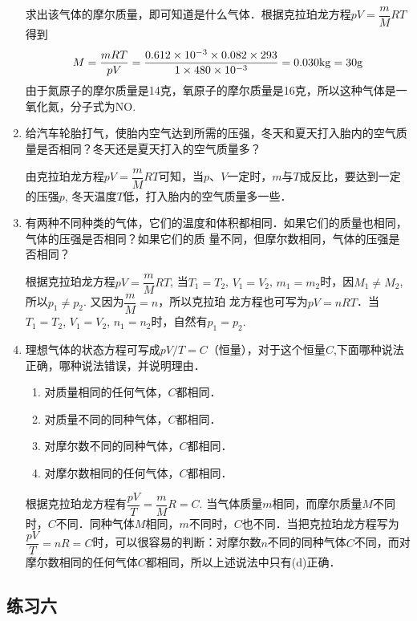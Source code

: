 \begin{enumerate}
\begin{solution}
         求出该气体的摩尔质量，即可知道是什么气体．根据克拉珀龙方程$pV=\dfrac{m}{M}RT$得到
\[M=\frac{mRT}{pV}=\frac{0.612\times 10^{-3}\times 0.082\times 293}{1\times 480\times 10^{-3}}=0.030{\rm kg}=30{\rm g}\]
由于氮原子的摩尔质量是14克，氧原子的摩尔质量是16克，所以这种气体是一氧化氮，分子式为NO.
\end{solution}
\item 给汽车轮胎打气，使胎内空气达到所需的压强，冬天和夏天打入胎内的空气质量是否相同？冬天还是夏天打入的空气质量多？

\begin{solution}
由克拉珀龙方程$pV=\dfrac{m}{M}RT$可知，当$p$、$V$一定时，$m$与$T$成反比，要达到一定的压强$p$, 冬天温度$T$低，打入胎内的空气质量多一些．
\end{solution}
\item 有两种不同种类的气体，它们的温度和体积都相同．如果它们的质量也相同，气体的压强是否相同？如果它们的质
量不同，但摩尔数相同，气体的压强是否相同？

\begin{solution}
根据克拉珀龙方程$pV=\dfrac{m}{M}RT$, 当$T_1=T_2$, $V_1=V_2$, $m_1=m_2$时，因$M_1\ne M_2$, 所以$p_1\ne p_2$. 又因为$\dfrac{m}{M}=n$，所以克拉珀
龙方程也可写为$pV=nRT$．当$T_1=T_2$, $V_1=V_2$, $n_1=n_2$时，自然有$p_1=p_2$.
\end{solution}
\item 理想气体的状态方程可写成$pV/T=C$（恒量），对于这个恒量$C$,下面哪种说法正确，哪种说法错误，并说明理由．
\begin{enumerate}
\item 对质量相同的任何气体，$C$都相同．\item 对质量不同的同种气体，$C$都相同．	\item 对摩尔数不同的同种气体，$C$都相同．\item 对摩尔数相同的任何气体，$C$都相同．
\end{enumerate}

\begin{solution}
根据克拉珀龙方程有$\dfrac{pV}{T}=\dfrac{m}{M}R=C$. 当气体质量$m$相同，而摩尔质量$M$不同时，$C$不同．同种气体$M$相同，$m$不同时，$C$也不同．当把克拉珀龙方程写为$\dfrac{pV}{T}=nR=C$时，可以很容易的判断：对摩尔数$n$不同的同种气体$C$不同，而对摩尔数相同的任何气体$C$都相同，所以上述说法中只有(d)正确．
\end{solution}
\end{enumerate}

\subsection{练习六}

